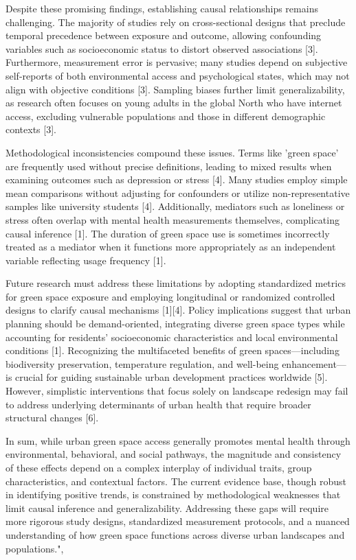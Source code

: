 \documentclass[conference]{IEEEtran}
\begin{document}
Despite these promising findings, establishing causal relationships remains challenging. The majority of studies rely on cross-sectional designs that preclude temporal precedence between exposure and outcome, allowing confounding variables such as socioeconomic status to distort observed associations [3]. Furthermore, measurement error is pervasive; many studies depend on subjective self-reports of both environmental access and psychological states, which may not align with objective conditions [3]. Sampling biases further limit generalizability, as research often focuses on young adults in the global North who have internet access, excluding vulnerable populations and those in different demographic contexts [3].

Methodological inconsistencies compound these issues. Terms like 'green space' are frequently used without precise definitions, leading to mixed results when examining outcomes such as depression or stress [4]. Many studies employ simple mean comparisons without adjusting for confounders or utilize non-representative samples like university students [4]. Additionally, mediators such as loneliness or stress often overlap with mental health measurements themselves, complicating causal inference [1]. The duration of green space use is sometimes incorrectly treated as a mediator when it functions more appropriately as an independent variable reflecting usage frequency [1].

Future research must address these limitations by adopting standardized metrics for green space exposure and employing longitudinal or randomized controlled designs to clarify causal mechanisms [1][4]. Policy implications suggest that urban planning should be demand-oriented, integrating diverse green space types while accounting for residents' socioeconomic characteristics and local environmental conditions [1]. Recognizing the multifaceted benefits of green spaces—including biodiversity preservation, temperature regulation, and well-being enhancement—is crucial for guiding sustainable urban development practices worldwide [5]. However, simplistic interventions that focus solely on landscape redesign may fail to address underlying determinants of urban health that require broader structural changes [6].

In sum, while urban green space access generally promotes mental health through environmental, behavioral, and social pathways, the magnitude and consistency of these effects depend on a complex interplay of individual traits, group characteristics, and contextual factors. The current evidence base, though robust in identifying positive trends, is constrained by methodological weaknesses that limit causal inference and generalizability. Addressing these gaps will require more rigorous study designs, standardized measurement protocols, and a nuanced understanding of how green space functions across diverse urban landscapes and populations.",
\end{document}
